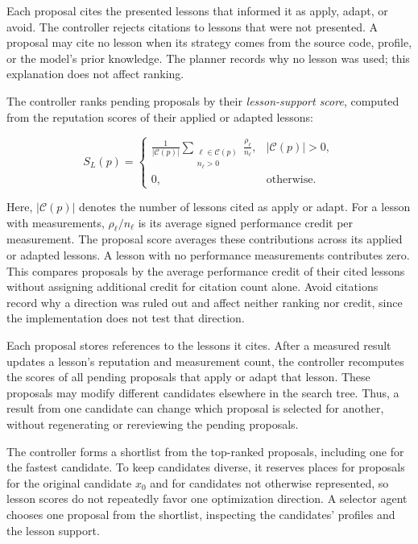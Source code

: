 \documentclass[acmsmall,screen,review,anonymous,nonacm]{acmart}
\begin{document}
Each proposal cites the presented lessons that informed it as apply, adapt, or
avoid. The controller rejects citations to lessons that were not
presented.
A proposal may cite no lesson when its strategy comes from the source code,
profile, or the model's prior knowledge. The planner records why no lesson was
used; this explanation does not affect ranking.

The controller ranks pending proposals by their \emph{lesson-support score},
computed from the reputation scores of their applied or adapted lessons:
\par\noindent\begin{minipage}{\dimexpr0.51\textwidth-\columnsep\relax}
\begin{equation}
S_L(p)=
\begin{cases}
\displaystyle \frac{1}{|\mathcal{C}(p)|}
\sum_{\substack{\ell\in\mathcal{C}(p)\\n_\ell>0}}\frac{\rho_\ell}{n_\ell},
& |\mathcal{C}(p)|>0,\\[7pt]
0, & \text{otherwise.}
\end{cases}
\label{eq:proposal-score}
\end{equation}
\end{minipage}\par
Here, $|\mathcal{C}(p)|$ denotes the number of lessons cited as apply or
adapt. For a lesson with measurements, $\rho_\ell/n_\ell$ is its average signed
performance credit per measurement. The proposal score averages these
contributions across its applied or adapted lessons. A lesson with no performance
measurements contributes zero. This compares proposals by the average performance
credit of their cited lessons without assigning additional credit for citation
count alone. Avoid citations record why a
direction was ruled out and affect neither ranking nor credit, since the implementation
does not test that direction.

Each proposal stores references to the lessons it cites. After a measured result
updates a lesson's reputation and measurement count, the controller recomputes
the scores of all pending proposals that apply or adapt that lesson. These
proposals may modify different candidates elsewhere in the search tree.
Thus, a result from one candidate can change which proposal is selected for
another, without regenerating or rereviewing the pending proposals.

The controller forms a shortlist from the top-ranked proposals, including one for the fastest
candidate. To keep candidates diverse, it reserves places for proposals for the original candidate
$x_0$ and for candidates not otherwise represented, so lesson scores do not repeatedly favor one
optimization direction. A selector agent chooses one proposal from the shortlist, inspecting the
candidates' profiles and the lesson support.
\end{document}
